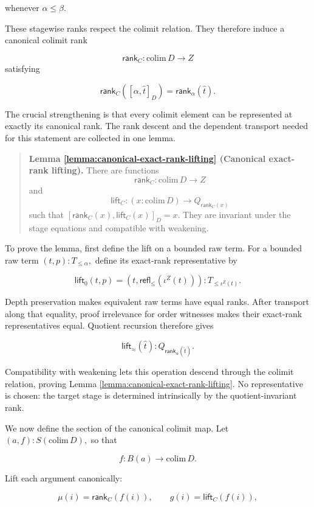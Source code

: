 \documentclass[runningheads]{llncs}
\begin{document}
whenever \(\alpha\leq\beta\).

These stagewise ranks respect the colimit relation. They therefore
induce a canonical colimit rank

\[
\mathsf{rank}_C:\mathrm{colim}\,D\to Z
\]
satisfying

\[
\mathsf{rank}_C ([\alpha,\widehat{t}]_D)
=
\mathsf{rank}_\alpha (\widehat{t}).
\]

The crucial strengthening is that every colimit element can be
represented at exactly its canonical rank. The rank descent and the
dependent transport needed for this statement are collected in one
lemma.

\begin{quote}
\textbf{Lemma \ref{lemma:canonical-exact-rank-lifting} (Canonical exact-rank lifting).}\label{lemma:canonical-exact-rank-lifting} There are functions
\[
\mathsf{rank}_C:\mathrm{colim}\,D\to Z
\] and \[
\mathsf{lift}_C:
(x:\mathrm{colim}\,D)\to Q_{\mathsf{rank}_C (x)}
\] such that \([\mathsf{rank}_C (x),\mathsf{lift}_C (x)]_D=x\). They are
invariant under the stage equations and compatible with weakening.
\end{quote}

To prove the lemma, first define the lift on a bounded raw term. For a
bounded raw term \((t,p):T_{\leq\alpha},\) define its exact-rank
representative by

\[
\mathsf{lift}_0 (t,p)
=
\left(
t,
\mathsf{refl}_{\leq} (\iota^Z (t))
\right)
:
T_{\leq\iota^Z (t)}.
\]

Depth preservation makes equivalent raw terms have equal ranks. After
transport along that equality, proof irrelevance for order witnesses
makes their exact-rank representatives equal. Quotient recursion
therefore gives

\[
\mathsf{lift}_{\approx} (\widehat{t})
:
Q_{\mathsf{rank}_\alpha (\widehat{t})}.
\]

Compatibility with weakening lets this operation descend through the
colimit relation, proving Lemma \ref{lemma:canonical-exact-rank-lifting}. No representative is chosen: the
target stage is determined intrinsically by the quotient-invariant rank.

We now define the section of the canonical colimit map. Let
\((a,f):S (\mathrm{colim}\,D),\) so that

\[
f:B (a)\to\mathrm{colim}\,D.
\]

Lift each argument canonically:

\[
\mu (i)=\mathsf{rank}_C (f (i)),
\qquad
\widehat{g} (i)=\mathsf{lift}_C (f (i)),
\]
\end{document}
